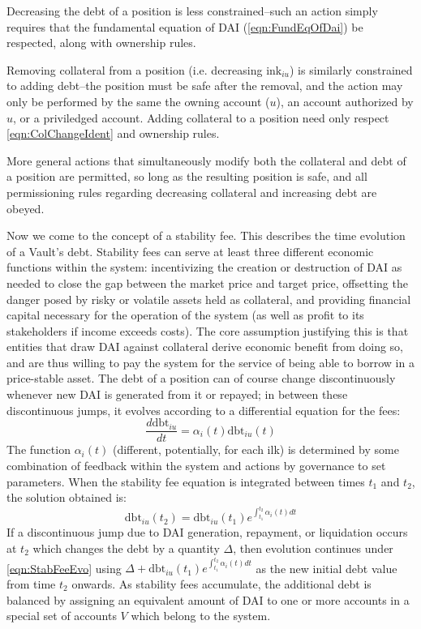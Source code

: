 \documentclass{article}
\begin{document}
Decreasing the debt of a position is less constrained--such an action simply requires that the fundamental equation of DAI (\ref{eqn:FundEqOfDai}) be respected, along with ownership rules.

Removing collateral from a position (i.e. decreasing \(\text{ink}_{iu}\)) is similarly constrained to adding debt--the position must be safe after the removal, and the action may only be performed by the same
the owning account (\(u\)), an account authorized by \(u\), or a priviledged account. Adding collateral to a position need only respect \ref{eqn:ColChangeIdent} and ownership rules.

More general actions that simultaneously modify both the collateral and debt of a position are permitted, so long as the resulting position is safe, and all permissioning rules regarding decreasing collateral
and increasing debt are obeyed.

Now we come to the concept of a stability fee. This describes the time evolution of a Vault's debt. Stability fees can serve at least three different 
economic functions within the system: incentivizing the creation or destruction of DAI as needed to close the gap between the market price and target price, offsetting the danger posed by risky or volatile 
assets held as collateral, and providing financial capital necessary for the operation of the system (as well as profit to its stakeholders if income exceeds costs). The core assumption justifying this is that
entities that draw DAI against collateral derive economic benefit from doing so, and are thus willing to pay the system for the service of being able to borrow in a price-stable asset. The debt of a position
can of course change discontinuously whenever new DAI is generated from it or repayed; in between these discontinuous jumps, it evolves according to a differential equation for the fees:
\begin{equation}
    \label{eqn:StabFeeEvo}
    \frac{d\text{dbt}_{iu}}{dt} = \alpha_i(t)\text{dbt}_{iu}(t)
\end{equation}
The function \(\alpha_i(t)\) (different, potentially, for each ilk) is determined by some combination of feedback within the system and actions by governance to set parameters. When the stability fee equation
is integrated between times \(t_1\) and \(t_2\), the solution obtained is:
\begin{equation}
    \text{dbt}_{iu}(t_2) = \text{dbt}_{iu}(t_1) e^{\int_{t_1}^{t_2} \alpha_i(t)dt}
\end{equation}
If a discontinuous jump due to DAI generation, repayment, or liquidation occurs at \(t_2\) which changes the debt by a quantity \(\Delta\), then evolution continues under \ref{eqn:StabFeeEvo} using
\(\Delta + \text{dbt}_{iu}(t_1) e^{\int_{t_1}^{t_2} \alpha_i(t)dt}\) as the new initial debt value from time \(t_2\) onwards. As stability fees accumulate, the additional debt is balanced by assigning an
equivalent amount of DAI to one or more accounts in a special set of accounts \(V\) which belong to the system.
\end{document}
